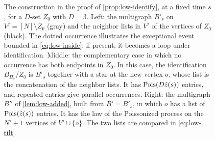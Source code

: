 \begin{figure}[t]
\centering

\caption{The construction in the proof of \cref{prop:low-identify}, at a fixed time $s$, for a $D$-set $Z_0$ with $D = 3$. Left: the multigraph $B'_s$ on $V' = [N] \setminus Z_0$ (gray) and the neighbor lists in $V'$ of the vertices of $Z_0$ (black). The dotted occurrence illustrates the exceptional event bounded in \eqref{eq:low-inside}; if present, it becomes a loop under identification. Middle: the complementary case in which no occurrence has both endpoints in $Z_0$. In this case, the identification $B_{\Pi_s}/Z_0$ is $B'_s$ together with a star at the new vertex $o$, whose list is the concatenation of the neighbor lists. It has $\operatorname{Pois}(D \hat z(s))$ entries, and repeated entries give parallel occurrences. Right: the multigraph $B''$ of \cref{lem:low-added}, built from $B' = B'_s$, in which $o$ has a list of $\operatorname{Pois}(\hat z(s))$ entries. It has the law of the Poissonized process on the $N' + 1$ vertices of $V' \cup \{o\}$. The two lists are compared in \eqref{eq:low-tilt}.}
\label{fig:low-identify}
\end{figure}

